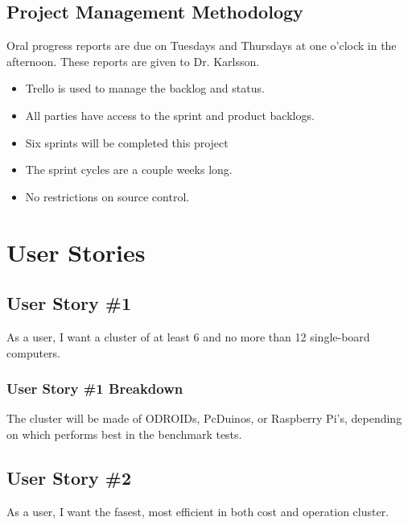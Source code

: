 \subsection{Project  Management Methodology}
Oral progress reports are due on Tuesdays and Thursdays at one o'clock in the 
afternoon. These reports are given to Dr. Karlsson. 
 
\begin{itemize}
\item Trello is used to manage the backlog and status.
\item All parties have access to the sprint and product backlogs.
\item Six sprints will be completed this project
\item The sprint cycles are a couple weeks long.
\item No restrictions on source control.
\end{itemize}

\section{User Stories}


\subsection{User Story \#1}
As a user, I want a cluster of at least 6 and no more than 12 single-board computers.
\subsubsection{User Story \#1 Breakdown}
The cluster will be made of ODROIDs, PcDuinos, or Raspberry Pi's, depending on which performs best in the benchmark tests.

\subsection{User Story \#2} 
As a user, I want the fasest, most efficient in both cost and operation cluster.
